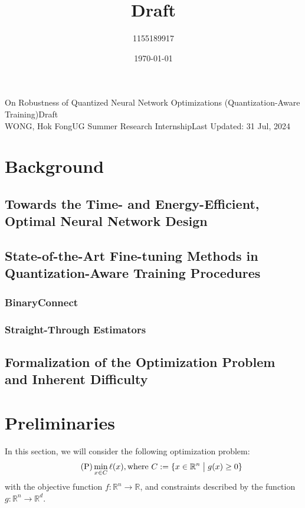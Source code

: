 \documentclass[10pt,a4paper]{article}
\author{1155189917}
\title{Draft}
\date{\today}
\begin{document}
\noindent On Robustness of Quantized Neural Network Optimizations (Quantization-Aware Training)\hfill Draft\\
WONG, Hok Fong\hfill UG Summer Research Internship\hfill Last Updated: 31 Jul, 2024\\
\phantom{}\hrulefill

\section{Background}

\subsection{Towards the Time- and Energy-Efficient, Optimal Neural Network Design}

\subsection{State-of-the-Art Fine-tuning Methods in Quantization-Aware Training Procedures}

\subsubsection{BinaryConnect}

\subsubsection{Straight-Through Estimators}

\subsection{Formalization of the Optimization Problem and Inherent Difficulty}

\section{Preliminaries}


In this section, we will consider the following optimization problem:
\begin{equation}\label{P}\tag{P} \min\limits_{x\in C} \ell(x), \text{where } C:=\{x\in \mathbb{R}^n \bigm| g(x)\geq 0\}\end{equation}
with the objective function $f:\mathbb{R}^n\rightarrow \mathbb{R}$, and constraints described by the function $g: \mathbb{R}^n \rightarrow \mathbb{R}^d$.
\end{document}
